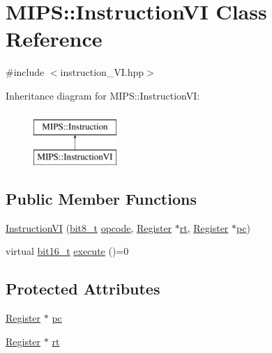 \hypertarget{classMIPS_1_1InstructionVI}{}\section{M\+I\+PS\+:\+:Instruction\+VI Class Reference}
\label{classMIPS_1_1InstructionVI}


{\ttfamily \#include $<$instruction\+\_\+\+V\+I.\+hpp$>$}

Inheritance diagram for M\+I\+PS\+:\+:Instruction\+VI\+:\begin{figure}[H]
\begin{center}
\leavevmode
\includegraphics[height=2.000000cm]{classMIPS_1_1InstructionVI}
\end{center}
\end{figure}
\subsection*{Public Member Functions}
\begin{DoxyCompactItemize}
\item 
\hyperlink{classMIPS_1_1InstructionVI_a21d1521859953e06854fd741fbfe22c1}{Instruction\+VI} (\hyperlink{core_8hpp_a6074bae122ae7b527864eec42c728c3c}{bit8\+\_\+t} \hyperlink{classMIPS_1_1Instruction_a45cc6808b5dde8a5d41067d148b55476}{opcode}, \hyperlink{classMIPS_1_1Register}{Register} $\ast$\hyperlink{classMIPS_1_1InstructionVI_a0a48712f3022c8c5731f6d4d371a2515}{rt}, \hyperlink{classMIPS_1_1Register}{Register} $\ast$\hyperlink{classMIPS_1_1InstructionVI_a6d2e8e3afa4cf64d0b08b1907db097f3}{pc})
\item 
virtual \hyperlink{core_8hpp_adc265a970bc35995b5879784bbb3f1b7}{bit16\+\_\+t} \hyperlink{classMIPS_1_1InstructionVI_a0a334d9d507fca448eaa7b0190c17531}{execute} ()=0
\end{DoxyCompactItemize}
\subsection*{Protected Attributes}
\begin{DoxyCompactItemize}
\item 
\hyperlink{classMIPS_1_1Register}{Register} $\ast$ \hyperlink{classMIPS_1_1InstructionVI_a6d2e8e3afa4cf64d0b08b1907db097f3}{pc}
\item 
\hyperlink{classMIPS_1_1Register}{Register} $\ast$ \hyperlink{classMIPS_1_1InstructionVI_a0a48712f3022c8c5731f6d4d371a2515}{rt}
\end{DoxyCompactItemize}


